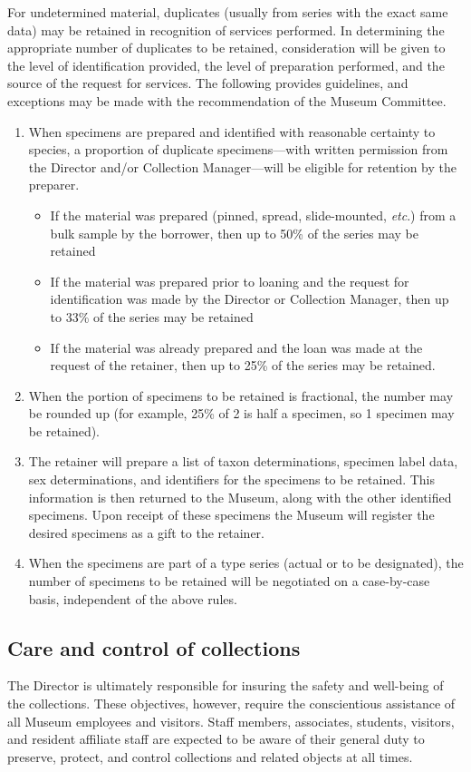 \documentclass[letterpaper, 11pt]{article}
\begin{document}
\noindent{}For undetermined material, duplicates (usually from series with the exact same data) may be retained in recognition of services performed. In determining the appropriate number of duplicates to be retained, consideration will be given to the level of identification provided, the level of preparation performed, and the source of the request for services. The following provides guidelines, and exceptions may be made with the recommendation of the Museum Committee. 
\begin{enumerate}
\item When specimens are prepared and identified with reasonable certainty to species, a proportion of duplicate specimens---with written permission from the Director and/or Collection Manager---will be eligible for retention by the preparer.
\begin{itemize}
\item If the material was prepared (pinned, spread, slide-mounted, \textit{etc}.) from a bulk sample by the borrower, then up to 50\% of the series may be retained
\item If the material was prepared prior to loaning and the request for identification was made by the Director or Collection Manager, then up to 33\% of the series may be retained
\item If the material was already prepared and the loan was made at the request of the retainer, then up to 25\% of the series may be retained.
\end{itemize}
\item When the portion of specimens to be retained is fractional, the number may be rounded up (for example, 25\% of 2 is half a specimen, so 1 specimen may be retained).
\item The retainer will prepare a list of taxon determinations, specimen label data, sex determinations, and identifiers for the specimens to be retained. This information is then returned to the Museum, along with the other identified specimens. Upon receipt of these specimens the Museum will register the desired specimens as a gift to the retainer.
\item When the specimens are part of a type series (actual or to be designated), the number of specimens to be retained will be negotiated on a case-by-case basis, independent of the above rules.
\end{enumerate}

\subsection{Care and control of collections}
The Director is ultimately responsible for insuring the safety and well-being of the collections. These objectives, however, require the conscientious assistance of all Museum employees and visitors. Staff members, associates, students, visitors, and resident affiliate staff are expected to be aware of their general duty to preserve, protect, and control collections and related objects at all times.\\
\end{document}
